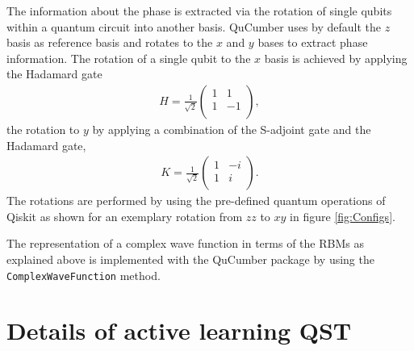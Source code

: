 \documentclass[pra,aps,showpacs,groupedaddress,superscriptaddress,twocolumn,toc=flat,biblatex,footinbib]{revtex4-1}
\begin{document}
The information about the phase is extracted via the rotation of single qubits within a quantum circuit into another basis. QuCumber uses by default the $z$ basis as reference basis and rotates to the $x$ and $y$ bases to extract phase information. The rotation of a single qubit to the $x$ basis is achieved by applying the Hadamard gate 
\begin{align}
    H = \frac{1}{\sqrt{2}}\left( \begin{array}{rr}
1 & 1  \\ 
1 & -1 \\
\end{array}\right),
\label{eq:Hadamard}
\end{align}
the rotation to $y$ by applying a combination of the S-adjoint gate and the Hadamard gate,
\begin{align}
    K = \frac{1}{\sqrt{2}}\left( \begin{array}{rr}
1 & -i \\ 
1 & i \\
\end{array}\right).
\label{eq:K}
\end{align}
The rotations are performed by using the pre-defined quantum operations of Qiskit as shown for an exemplary rotation from $zz$ to $xy$ in figure \ref{fig:Configs}.

The representation of a complex wave function in terms of the RBMs as explained above is implemented with the QuCumber package by using the \texttt{ComplexWaveFunction} method.


\section{Details of active learning QST}

\end{document}
